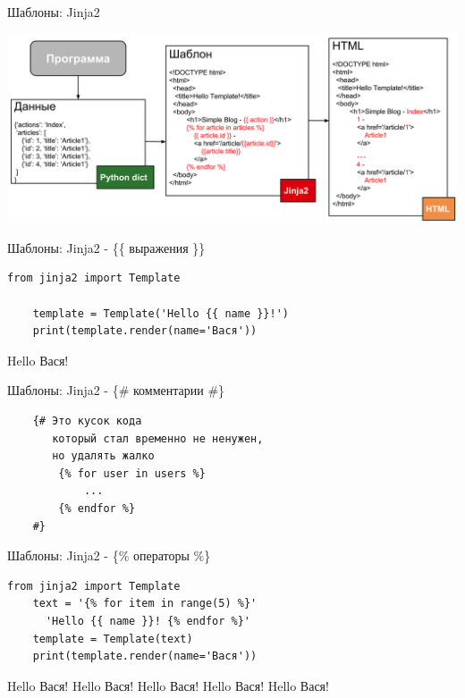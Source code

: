 \begin{frame}{Шаблоны: Jinja2}

  \begin{center}
    \includegraphics[width=\textwidth,height=\textheight,keepaspectratio]{media/template.png}
  \end{center}

\end{frame}

\begin{frame}[fragile]{Шаблоны: Jinja2 - \{\{ выражения \}\}}

  \begin{lstlisting}[style=Python]
    from jinja2 import Template

    template = Template('Hello {{ name }}!')
    print(template.render(name='Вася'))
  \end{lstlisting}

  Hello Вася!

\end{frame}

\begin{frame}[fragile]{Шаблоны: Jinja2 - \{\# комментарии \#\}}

  \begin{lstlisting}
    {# Это кусок кода
       который стал временно не ненужен,
       но удалять жалко
        {% for user in users %}
            ...
        {% endfor %}
    #}
  \end{lstlisting}

\end{frame}

\begin{frame}[fragile]{Шаблоны: Jinja2 - \{\% операторы \%\}}

  \begin{lstlisting}[style=Python]
    from jinja2 import Template
    text = '{% for item in range(5) %}'
      'Hello {{ name }}! {% endfor %}'
    template = Template(text)
    print(template.render(name='Вася'))
  \end{lstlisting}

  Hello Вася! Hello Вася! Hello Вася! Hello Вася! Hello Вася!

\end{frame}

